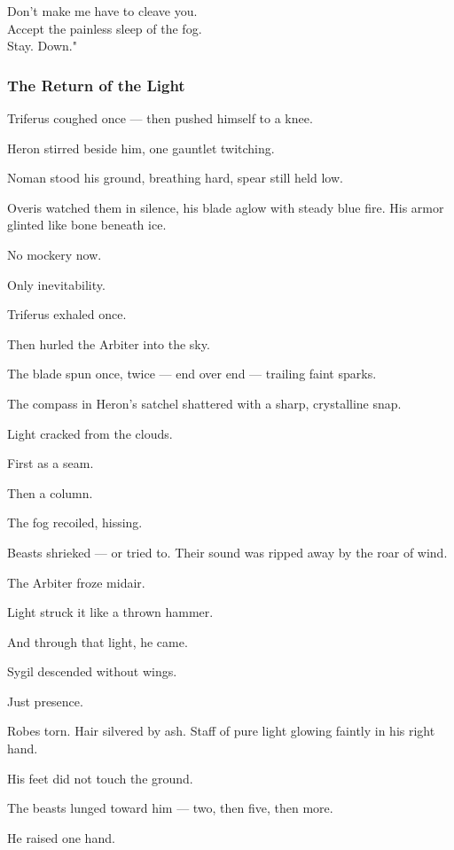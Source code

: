 \documentclass[12pt]{article}
\begin{document}
Don't make me have to cleave you.\\

Accept the painless sleep of the fog.\\

Stay. Down."

\dotfill

\subsubsection*{The Return of the Light}
Triferus coughed once — then pushed himself to a knee.

Heron stirred beside him, one gauntlet twitching.

Noman stood his ground, breathing hard, spear still held low.

Overis watched them in silence, his blade aglow with steady blue fire. His armor glinted like bone beneath ice.

No mockery now.

Only inevitability.

\bigskip

Triferus exhaled once.

Then hurled the Arbiter into the sky.

The blade spun once, twice — end over end — trailing faint sparks.

The compass in Heron’s satchel shattered with a sharp, crystalline snap.

Light cracked from the clouds.

First as a seam.

Then a column.

The fog recoiled, hissing.

Beasts shrieked — or tried to. Their sound was ripped away by the roar of wind.

The Arbiter froze midair.

Light struck it like a thrown hammer.

And through that light, he came.

\bigskip

Sygil descended without wings.

Just presence.

Robes torn. Hair silvered by ash. Staff of pure light glowing faintly in his right hand.

His feet did not touch the ground.

The beasts lunged toward him — two, then five, then more.

He raised one hand.
\end{document}
